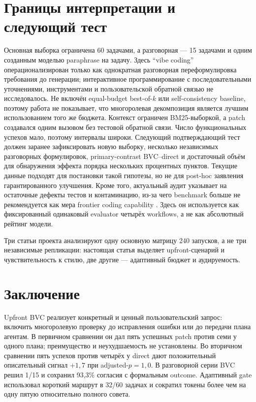 \documentclass[11pt]{article}
\begin{document}
\section{Границы интерпретации и следующий тест}

Основная выборка ограничена 60 задачами, а разговорная --- 15 задачами и
одним созданным моделью paraphrase на задачу. Здесь
\enquote{vibe coding} операционализирован только как однократная разговорная
переформулировка требования до генерации; интерактивное программирование с
последовательными уточнениями, инструментами и пользовательской обратной
связью не исследовалось. Не включён equal-budget best-of-\(k\) или
self-consistency baseline, поэтому работа не показывает, что многоролевая
декомпозиция является лучшим использованием того же бюджета. Контекст
ограничен BM25-выборкой, а patch создавался одним вызовом без тестовой обратной
связи. Число функциональных успехов мало, поэтому интервалы
широки. Следующий подтверждающий тест должен заранее зафиксировать новую
выборку, несколько независимых разговорных формулировок, primary-contrast
BVC--direct и достаточный объём для обнаружения эффекта порядка нескольких
процентных пунктов. Текущие данные подходят для постановки такой гипотезы,
но не для post-hoc заявления гарантированного улучшения. Кроме того,
актуальный аудит \dataset{} указывает на остаточные дефекты тестов и
контаминацию, из-за чего benchmark больше не рекомендуется как мера
frontier coding capability \cite{openai2026verifiedlimits}. Здесь он
используется как фиксированный одинаковый evaluator четырёх workflows, а не
как абсолютный рейтинг модели.

Три статьи проекта анализируют одну основную матрицу 240 запусков, а не три
независимые репликации: настоящая статья выделяет upfront-сценарий и
чувствительность к стилю, две другие --- адаптивный бюджет и аудируемость.

\section{Заключение}

Upfront BVC реализует конкретный и ценный пользовательский запрос: включить
многоролевую проверку до исправления ошибки или до передачи плана агентам.
В первичном сравнении он дал пять успешных patch против семи у одного плана;
преимущество и неухудшаемость не установлены. Во вторичном сравнении пять
успехов против четырёх у direct дают положительный описательный сигнал
\(+1{,}7\) \pp{} при adjusted-\(p=1{,}0\). В разговорной
серии BVC решил 1/15 и сохранил 93,3\% согласия с формальным outcome.
Адаптивный gate использовал короткий маршрут в 32/60 задачах и сократил
токены более чем на одну пятую относительно полного совета.
\end{document}

